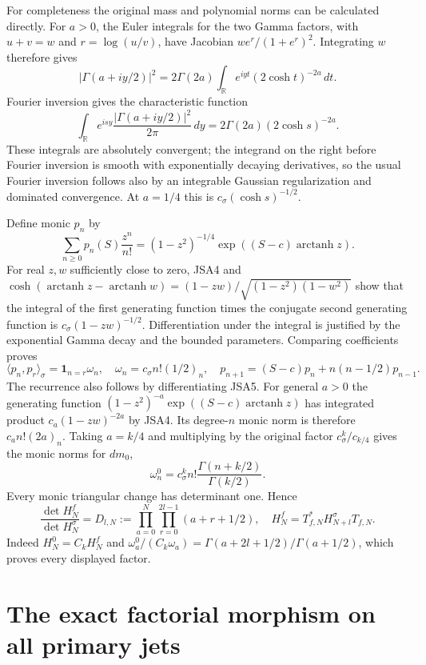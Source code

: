 \documentclass[11pt,a4paper]{article}
\begin{document}
For completeness the original mass and polynomial norms can be
calculated directly. For $a>0$, the Euler integrals for the two Gamma
factors, with $u+v=w$ and $r=\log(u/v)$, have Jacobian
$w e^r/(1+e^r)^2$. Integrating $w$ therefore gives
\[
 |\Gamma(a+iy/2)|^2
  =2\Gamma(2a)\int_{\mathbb R}
       e^{iyt}(2\cosh t)^{-2a}\,dt.
\]
Fourier inversion gives the characteristic function
\[
 \int_{\mathbb R}e^{isy}
    \frac{|\Gamma(a+iy/2)|^2}{2\pi}\,dy
   =2\Gamma(2a)(2\cosh s)^{-2a}.\tag{JSA4}
\]
These integrals are absolutely convergent; the integrand on the
right before Fourier inversion is smooth with exponentially
decaying derivatives, so the usual Fourier inversion follows also
by an integrable Gaussian regularization and dominated convergence.
At $a=1/4$ this is $c_\sigma(\cosh s)^{-1/2}$.

Define monic $p_n$ by
\[
 \sum_{n\geq0}p_n(S)\frac{z^n}{n!}
   =(1-z^2)^{-1/4}\exp((S-c)\operatorname{arctanh}z).
\tag{JSA5}
\]
For real $z,w$ sufficiently close to zero, JSA4 and
$\cosh(\operatorname{arctanh}z-\operatorname{arctanh}w)
=(1-zw)/\sqrt{(1-z^2)(1-w^2)}$ show that the integral of the
first generating function times the conjugate second generating
function is $c_\sigma(1-zw)^{-1/2}$. Differentiation under the
integral is justified by the exponential Gamma decay and the
bounded parameters. Comparing coefficients proves
\[
 \langle p_n,p_r\rangle_\sigma
   =\boldsymbol1_{n=r}\omega_n,
 \quad\omega_n=c_\sigma n!(1/2)_n,
 \quad p_{n+1}=(S-c)p_n+n(n-1/2)p_{n-1}.
\tag{JSA6}
\]
The recurrence also follows by differentiating JSA5. For general
$a>0$ the generating function
$(1-z^2)^{-a}\exp((S-c)\operatorname{arctanh}z)$ has integrated
product $c_a(1-zw)^{-2a}$ by JSA4. Its degree-$n$ monic norm is
therefore $c_a n!(2a)_n$. Taking $a=k/4$ and multiplying by the
original factor $c_\sigma^k/c_{k/4}$ gives the monic norms for $dm_0$,
\[
 \omega_n^0=c_\sigma^k n!\frac{\Gamma(n+k/2)}{\Gamma(k/2)}.
\]
Every monic triangular change has determinant one. Hence
\[
 \frac{\det H_N^f}{\det H_N^\sigma}
   =D_{l,N}:=\prod_{a=0}^N\prod_{r=0}^{2l-1}(a+r+1/2),
 \quad H_N^f=T_{f,N}^*H_{N+l}^\sigma T_{f,N}.
\tag{JSA7}
\]
Indeed $H_N^0=C_kH_N^f$ and
$\omega_a^0/(C_k\omega_a)=\Gamma(a+2l+1/2)/\Gamma(a+1/2)$,
which proves every displayed factor.

\section{The exact factorial morphism on all primary jets}
\end{document}
